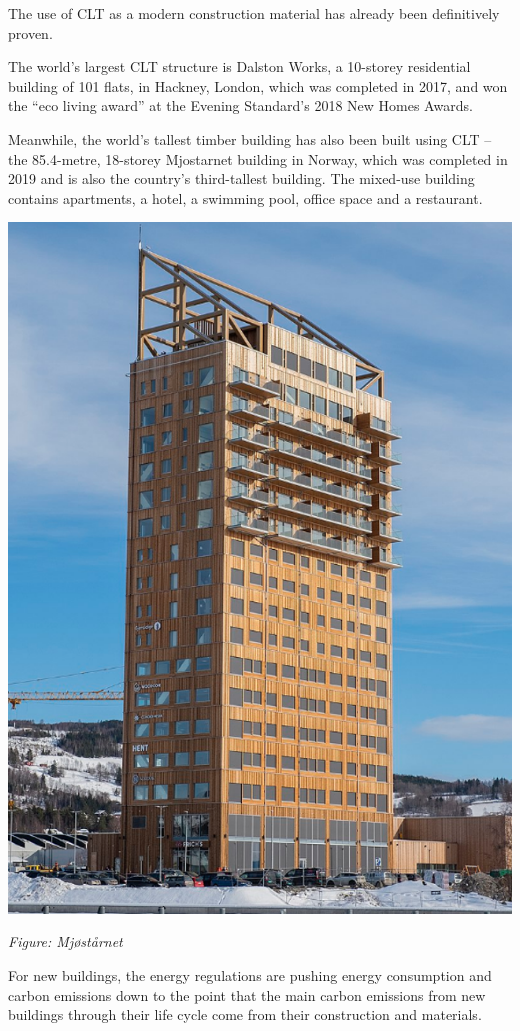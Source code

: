 \documentclass[
]{book}
\begin{document}
The use of CLT as a modern construction material has already been definitively proven.

The world's largest CLT structure is Dalston Works, a 10-storey residential building of 101 flats, in Hackney, London, which was completed in 2017, and won the ``eco living award'' at the Evening Standard's 2018 New Homes Awards.

Meanwhile, the world's tallest timber building has also been built using CLT -- the 85.4-metre, 18-storey Mjostarnet building in Norway, which was completed in 2019 and is also the country's third-tallest building. The mixed-use building contains apartments, a hotel, a swimming pool, office space and a restaurant.

\includegraphics{fig/mjostarnet.png}

\emph{Figure: Mjøstårnet}

For new buildings, the energy regulations are pushing energy consumption and carbon emissions down to the point that the main carbon emissions from new buildings through their life cycle come from their construction and materials.
\end{document}
